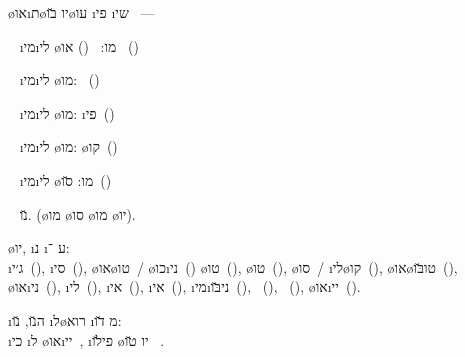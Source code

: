 \begin{framed}
	\o{או}\i{ת}\o{יו} \u{בו}\o{עו} \i{פי} \i{שי} ~—
\begin{compactitem}
\item {} ~ \i{מי}\i{לי} \o{מו}: ~() או ~()
\item {} ~ \i{מי}\i{לי} \o{מו}: ~()
\item {} ~ \i{מי}\i{לי} \o{מו}: \i{פי}~()
\item {} ~ \i{מי}\i{לי} \o{מו}: \o{קו}~()
\item {} ~ \i{מי}\i{לי} \o{מו}: \u{סו}~()
\item {} ~  \u{נו}. (\o{מו} \o{סו} \o{מו}   \o{יו}).
\end{compactitem}

 \o{יו}, \i{נ}  \i{ע} ־:\\
\i{ג׳י}~(),
\i{סי}~(),
\o{או}\o{טו}~/ \o{כו}\i{ני}~()
\o{טו}~(),
\o{טו}~(),
\o{סו}~/ \i{לי}\o{קו}~(),
\o{או}\o{טו}\u{בּו}~(),
\o{או}\i{ני}~(),
\i{לי}~(),
\i{אי}~(),
\i{אי}~(),
\i{מי}\i{ני}\u{בּו}~(),
~(),
~(),
\o{או}\i{יי}~().

 \i{ה}\u{נו}, \u{נו} \i{ל}\o{רוא} \i{מ} \u{דו}:\\
\i{כי}  \i{ל}  \o{או}\i{יי}~,  \i{פי}\u{לו} \o{יו}  \u{טו} ~.


\end{framed}
